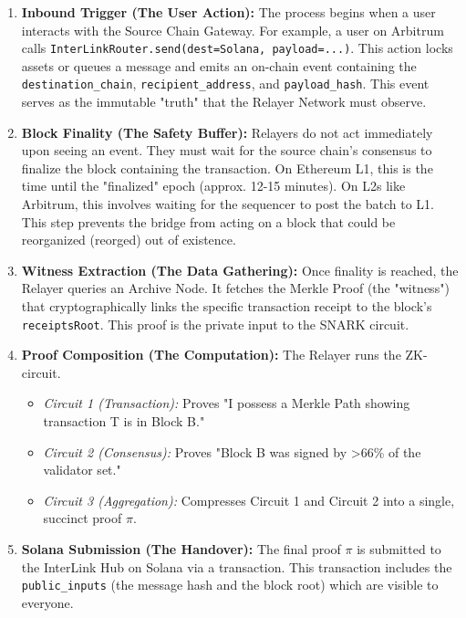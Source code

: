 \documentclass[11pt,a4paper]{article}
\begin{document}
\begin{enumerate}
    \item \textbf{Inbound Trigger (The User Action):} The process begins when a user interacts with the Source Chain Gateway. For example, a user on Arbitrum calls \texttt{InterLinkRouter.send(dest=Solana, payload=...)}. This action locks assets or queues a message and emits an on-chain event containing the \texttt{destination\_chain}, \texttt{recipient\_address}, and \texttt{payload\_hash}. This event serves as the immutable "truth" that the Relayer Network must observe.
    
    \item \textbf{Block Finality (The Safety Buffer):} Relayers do not act immediately upon seeing an event. They must wait for the source chain's consensus to finalize the block containing the transaction. On Ethereum L1, this is the time until the "finalized" epoch (approx. 12-15 minutes). On L2s like Arbitrum, this involves waiting for the sequencer to post the batch to L1. This step prevents the bridge from acting on a block that could be reorganized (reorged) out of existence.
    
    \item \textbf{Witness Extraction (The Data Gathering):} Once finality is reached, the Relayer queries an Archive Node. It fetches the Merkle Proof (the "witness") that cryptographically links the specific transaction receipt to the block's \texttt{receiptsRoot}. This proof is the private input to the SNARK circuit.
    
    \item \textbf{Proof Composition (The Computation):} The Relayer runs the ZK-circuit.
        \begin{itemize}
            \item \textit{Circuit 1 (Transaction):} Proves "I possess a Merkle Path showing transaction T is in Block B."
            \item \textit{Circuit 2 (Consensus):} Proves "Block B was signed by >66\% of the validator set."
            \item \textit{Circuit 3 (Aggregation):} Compresses Circuit 1 and Circuit 2 into a single, succinct proof $\pi$.
        \end{itemize}
        
    \item \textbf{Solana Submission (The Handover):} The final proof $\pi$ is submitted to the InterLink Hub on Solana via a transaction. This transaction includes the \texttt{public\_inputs} (the message hash and the block root) which are visible to everyone.
    

\end{enumerate}
\end{document}
